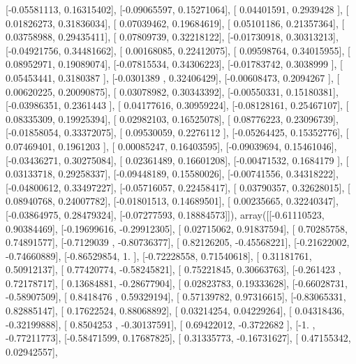 \documentclass{article}
\begin{document}
       [-0.05581113,  0.16315402],
       [-0.09065597,  0.15271064],
       [ 0.04401591,  0.2939428 ],
       [ 0.01826273,  0.31836034],
       [ 0.07039462,  0.19684619],
       [ 0.05101186,  0.21357364],
       [ 0.03758988,  0.29435411],
       [ 0.07809739,  0.32218122],
       [-0.01730918,  0.30313213],
       [-0.04921756,  0.34481662],
       [ 0.00168085,  0.22412075],
       [ 0.09598764,  0.34015955],
       [ 0.08952971,  0.19089074],
       [-0.07815534,  0.34306223],
       [-0.01783742,  0.3038999 ],
       [ 0.05453441,  0.3180387 ],
       [-0.0301389 ,  0.32406429],
       [-0.00608473,  0.2094267 ],
       [ 0.00620225,  0.20090875],
       [ 0.03078982,  0.30343392],
       [-0.00550331,  0.15180381],
       [-0.03986351,  0.2361443 ],
       [ 0.04177616,  0.30959224],
       [-0.08128161,  0.25467107],
       [ 0.08335309,  0.19925394],
       [ 0.02982103,  0.16525078],
       [ 0.08776223,  0.23096739],
       [-0.01858054,  0.33372075],
       [ 0.09530059,  0.2276112 ],
       [-0.05264425,  0.15352776],
       [ 0.07469401,  0.1961203 ],
       [ 0.00085247,  0.16403595],
       [-0.09039694,  0.15461046],
       [-0.03436271,  0.30275084],
       [ 0.02361489,  0.16601208],
       [-0.00471532,  0.1684179 ],
       [ 0.03133718,  0.29258337],
       [-0.09448189,  0.15580026],
       [-0.00741556,  0.34318222],
       [-0.04800612,  0.33497227],
       [-0.05716057,  0.22458417],
       [ 0.03790357,  0.32628015],
       [ 0.08940768,  0.24007782],
       [-0.01801513,  0.14689501],
       [ 0.00235665,  0.32240347],
       [-0.03864975,  0.28479324],
       [-0.07277593,  0.18884573]]), array([[-0.61110523,  0.90384469],
       [-0.19699616, -0.29912305],
       [ 0.02715062,  0.91837594],
       [ 0.70285758,  0.74891577],
       [-0.7129039 , -0.80736377],
       [ 0.82126205, -0.45568221],
       [-0.21622002, -0.74660889],
       [-0.86529854,  1.        ],
       [-0.72228558,  0.71540618],
       [ 0.31181761,  0.50912137],
       [ 0.77420774, -0.58245821],
       [ 0.75221845,  0.30663763],
       [-0.261423  ,  0.72178717],
       [ 0.13684881, -0.28677904],
       [ 0.02823783,  0.19333628],
       [-0.66028731, -0.58907509],
       [ 0.8418476 ,  0.59329194],
       [ 0.57139782,  0.97316615],
       [-0.83065331,  0.82885147],
       [ 0.17622524,  0.88068892],
       [ 0.03214254,  0.04229264],
       [ 0.04318436, -0.32199888],
       [ 0.8504253 , -0.30137591],
       [ 0.69422012, -0.3722682 ],
       [-1.        , -0.77211773],
       [-0.58471599,  0.17687825],
       [ 0.31335773, -0.16731627],
       [ 0.47155342,  0.02942557],
\end{document}
